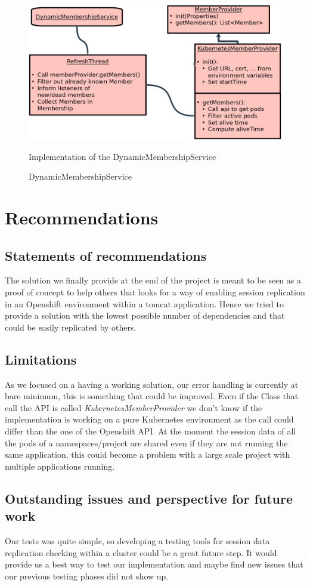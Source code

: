 \documentclass[11pt,a4paper]{article}
\begin{document}
\begin{figure}[h]
\centering
\caption{DynamicMembershipService}
\includegraphics[width=1\textwidth]{fig/dynamicMembership}

\label{dms}
\begin{footnotesize}
Implementation of the DynamicMembershipService 
\end{footnotesize}
\end{figure}

\section{Recommendations}

\subsection{Statements of recommendations}
The solution we finally provide at the end of the project is meant to be seen as a proof of concept to help others that looks for a way of enabling session replication in an Openshift environment within a tomcat application. Hence we tried to provide a solution with the lowest possible number of dependencies and that could be easily replicated by others.

\subsection{Limitations}
As we focused on a having a working solution, our error handling is currently at bare minimum, this is something that could be improved. 
Even if the Class that call the API is called \emph{KubernetesMemberProvider} we don't know if the implementation is working on a pure Kubernetes environment as the call could differ than the one of the Openshift API.
At the moment the session data of all the pods of a namespaces/project are shared even if they are not running the same application, this could become a problem with a large scale project with multiple applications running.

\subsection{Outstanding issues and perspective for future work}
Our tests was quite simple, so developing a testing tools for session data replication checking within a cluster could be a great future step. It would provide us a best way to test our implementation and maybe find new issues that our previous testing phases did not show up.
\end{document}
